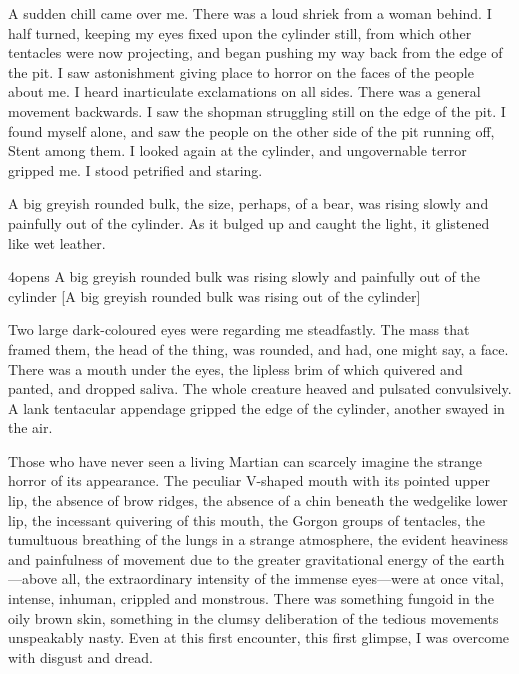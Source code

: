 A sudden chill came over me. There was a loud shriek from a woman behind. I half turned, keeping my eyes fixed upon the cylinder still, from which other tentacles were now projecting, and began pushing my way back from the edge of the pit. I saw astonishment giving place to horror on the faces of the people about me. I heard inarticulate exclamations on all sides. There was a general movement backwards. I saw the shopman struggling still on the edge of the pit. I found myself alone, and saw the people on the other side of the pit running off, Stent among them. I looked again at the cylinder, and ungovernable terror gripped me. I stood petrified and staring.

A big greyish rounded bulk, the size, perhaps, of a bear, was rising slowly and painfully out of the cylinder. As it bulged up and caught the light, it glistened like wet leather.


\begin{bwbigpic}
	[1.2] 
	{4opens} 
	{A big greyish rounded bulk was rising slowly and painfully out of the cylinder} 
	[A big greyish rounded bulk was rising out of the cylinder]
\end{bwbigpic}

Two large dark-coloured eyes were regarding me steadfastly. The mass that framed them, the head of the thing, was rounded, and had, one might say, a face. There was a mouth under the eyes, the lipless brim of which quivered and panted, and dropped saliva. The whole creature heaved and pulsated convulsively. A lank tentacular appendage gripped the edge of the cylinder, another swayed in the air.

Those who have never seen a living Martian can scarcely imagine the strange horror of its appearance. The peculiar V-shaped mouth with its pointed upper lip, the absence of brow ridges, the absence of a chin beneath the wedgelike lower lip, the incessant quivering of this mouth, the Gorgon groups of tentacles, the tumultuous breathing of the lungs in a strange atmosphere, the evident heaviness and painfulness of movement due to the greater gravitational energy of the earth—above all, the extraordinary intensity of the immense eyes—were at once vital, intense, inhuman, crippled and monstrous. There was something fungoid in the oily brown skin, something in the clumsy deliberation of the tedious movements unspeakably nasty. Even at this first encounter, this first glimpse, I was overcome with disgust and dread.

